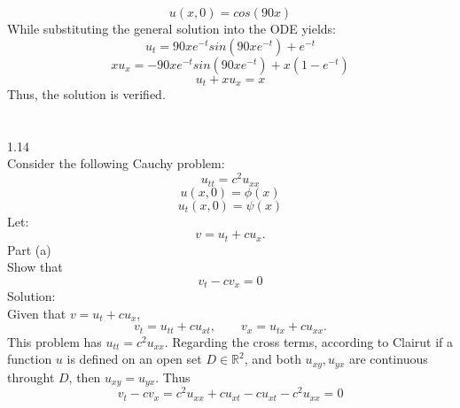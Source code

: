 \documentclass{article}
\begin{document}
\[u(x,0) = cos(90x)\]
While substituting the general solution into the ODE yields:
\[ u_{t} = 90xe^{-t}sin(90xe^{-t}) + e^{-t}\]
\[ xu_{x} = -90xe^{-t}sin(90xe^{-t}) + x(1-e^{-t})\]
\[u_{t} + xu_{x} = x\]
Thus, the solution is verified.\\
\\
\\
\large 1.14\\
\normalsize
Consider the following Cauchy problem:\\
\[u_{tt} = c^2u_{xx}\]
\[u(x,0) = \phi(x)\]
\[u_{t}(x,0) = \psi(x)\]
Let:\\
\[v = u_{t} + cu_{x}.\]
Part (a)\\
Show that \\
\[v_{t} - cv_{x} = 0\]
Solution:\\
Given that $v = u_{t} + cu_{x}$,
\[v_{t} = u_{tt} + cu_{xt},\qquad v_{x} = u_{tx} + cu_{xx}.\]
This problem has $ u_{tt} = c^2u_{xx}$. Regarding the cross terms, according to Clairut if a function $u$ is defined on an open set $D \in \mathbb{R}^2 $, and both $u_{xy}, u_{yx}$ are continuous throught $D$, then $ u_{xy} = u_{yx}$. Thus
\[ v_{t} - cv_{x} = c^2u_{xx}+cu_{xt} - cu_{xt} - c^2u_{xx} =0\]
\end{document}
